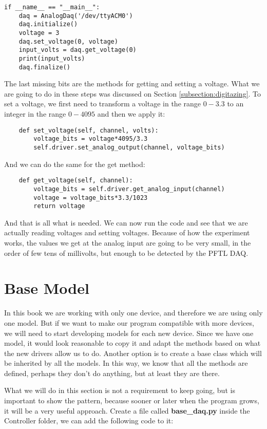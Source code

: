 \begin{verbatim}
if __name__ == "__main__":
    daq = AnalogDaq('/dev/ttyACM0')
    daq.initialize()
    voltage = 3
    daq.set_voltage(0, voltage)
    input_volts = daq.get_voltage(0)
    print(input_volts)
    daq.finalize()
\end{verbatim}

The last missing bits are the methods for getting and setting a voltage. What we are going to do in these steps was discussed on Section \ref{subsection:digitazing}. To set a voltage, we first need to transform a voltage in the range $0-3.3$ to an integer in the range $0-4095$ and then we apply it:

\begin{verbatim}
    def set_voltage(self, channel, volts):
        voltage_bits = voltage*4095/3.3
        self.driver.set_analog_output(channel, voltage_bits)
\end{verbatim}

And we can do the same for the get method:

\begin{verbatim}
    def get_voltage(self, channel):
        voltage_bits = self.driver.get_analog_input(channel)
        voltage = voltage_bits*3.3/1023
        return voltage
\end{verbatim}

And that is all what is needed. We can now run the code and see that we are actually reading voltages and setting voltages. Because of how the experiment works, the values we get at the analog input are going to be very small, in the order of few tens of millivolts, but enough to be detected by the {PFTL DAQ}.

\section{Base Model}\label{section:base-model}
In this book we are working with only one device, and therefore we are using only one model. But if we want to make our program compatible with more devices, we will need to start developing models for each new device. Since we have one model, it would look reasonable to copy it and adapt the methods based on what the new drivers allow us to do. Another option is to create a base class which will be inherited by all the models. In this way, we know that all the methods are defined, perhaps they don't do anything, but at least they are there.

What we will do in this section is not a requirement to keep going, but is important to show the pattern, because sooner or later when the program grows, it will be a very useful approach. Create a file called \textbf{base\_daq.py} inside the Controller folder, we can add the following code to it:

